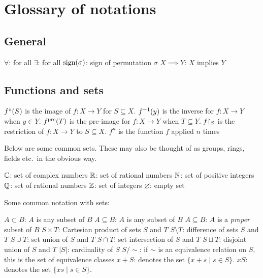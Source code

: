 \chapter{Glossary of notations}

\section{General}
\begin{itemize}
	\ii $\forall$: for all
	\ii $\exists$: for all
	\ii $\operatorname{sign}(\sigma)$: sign of permutation $\sigma$
	\ii $X \implies Y$: $X$ implies $Y$
\end{itemize}
\section{Functions and sets}
\begin{itemize}
	\ii $f``(S)$ is the image of $f : X \to Y$ for $S \subseteq X$.
	\ii $f^{-1}(y)$ is the inverse for $f : X \to Y$ when $y \in Y$.
	\ii $f^{\text{pre}}(T)$ is the pre-image for $f : X \to Y$ when $T \subseteq Y$.
	\ii $f \restrict{S}$ is the restriction of $f : X \to Y$ to $S \subseteq X$.
	\ii $f^n$ is the function $f$ applied $n$ times
\end{itemize}

Below are some common sets.
These may also be thought of as groups,
rings, fields etc.\ in the obvious way.
\begin{itemize}
	\ii $\mathbb C$: set of complex numbers
	\ii $\mathbb R$: set of rational numbers
	\ii $\mathbb N$: set of positive integers
	\ii $\mathbb Q$: set of rational numbers
	\ii $\mathbb Z$: set of integers
	\ii $\varnothing$: empty set
\end{itemize}

Some common notation with sets:
\begin{itemize}
	\ii $A \subset B$: $A$ is any subset of $B$
	\ii $A \subseteq B$: $A$ is any subset of $B$
	\ii $A \subseteq B$: $A$ is a \emph{proper} subset of $B$
	\ii $S \times T$: Cartesian product of sets $S$ and $T$
	\ii $S \setminus T$: difference of sets $S$ and $T$
	\ii $S \cup T$: set union of $S$ and $T$
	\ii $S \cap T$: set intersection of $S$ and $T$
	\ii $S \sqcup T$: disjoint union of $S$ and $T$
	\ii $\left\lvert S \right\rvert$: cardinality of $S$
	\ii $S / {\sim}$: if $\sim$ is an equivalence relation on $S$,
	this is the set of equivalence classes
	\ii $x + S$: denotes the set $\{x+s \mid s \in S\}$.
	\ii $xS$: denotes the set $\{xs \mid s \in S\}$.
\end{itemize}

